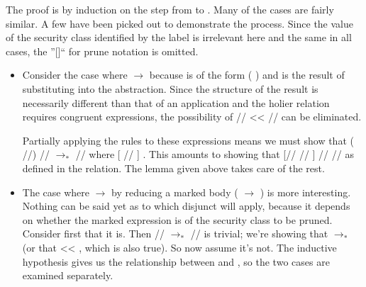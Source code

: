 \documentclass[12pt]{report}
\begin{document}
The proof is by induction on the step from  to
. Many of the cases are fairly similar. A few have been
picked out to demonstrate the process. Since the value of the
security class identified by the label is irrelevant here and the
same in all cases, the ''\coqdocvar{\_}[]`` for prune
notation is omitted. 




\begin{itemize}

\item  Consider the case where  $\to$ 
    because  is of the form 
        (  
        )  and  is the
        result of substituting  into the abstraction.
        Since the structure of the result is necessarily different
        than that of an application and the holier relation requires
        congruent expressions, the possibility of
          // <<
          // can be eliminated.


  Partially applying the  rules to these expressions
        means we must show that  (
         
        //)
        // $\to_*$
        // where
        [ // ] 
         . This amounts to showing
        that [// //
        ] //
         // as
        defined in the  relation. The
         lemma given above takes care
        of the rest.



\item  The case where  $\to$  by reducing
    a marked body ( 
         $\to$  
        ) is more interesting. Nothing can be said
        yet as to which disjunct will apply, because it depends on
        whether the marked expression is of the security class to be
        pruned. Consider first that it is. Then
         
        // $\to_*$
         
        // is trivial; we're showing that
         $\to_*$  (or that
         << , which is also true). So
        now assume it's not. The inductive hypothesis gives us the
        relationship between  and ,
        so the two cases are examined separately.




\end{itemize}
\end{document}
